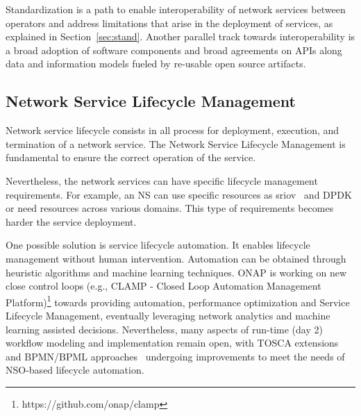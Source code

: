 Standardization is a path to enable interoperability of network services between operators and address limitations that arise in the deployment of services, as explained in Section~\ref{sec:stand}. Another parallel track towards interoperability is a broad adoption of software components and broad agreements on APIs along data and information models fueled by re-usable open source artifacts. 

\subsection{Network Service Lifecycle Management}

Network service lifecycle consists in all process for deployment, execution, and termination of a network service. The Network Service Lifecycle Management is fundamental to ensure the correct operation of the service.

Nevertheless, the network services can have specific lifecycle management requirements. For example, an NS can use specific resources as \gls{sriov}~\cite{5416637} and DPDK or need resources across various domains. This type of requirements becomes harder the service deployment.

One possible solution is service lifecycle automation. It enables lifecycle management without human intervention. Automation can be obtained through heuristic algorithms and machine learning techniques. ONAP is working on new close control loops (e.g., CLAMP - Closed Loop Automation Management Platform)\footnote{https://github.com/onap/clamp} towards providing automation, performance optimization and Service Lifecycle Management, eventually leveraging network analytics and machine learning assisted decisions.
Nevertheless, many aspects of run-time (day 2) workflow modeling and implementation remain open, with TOSCA extensions and BPMN/BPML approaches~\cite{DBLP:conf/closer/CalcaterraCMT17} undergoing improvements to meet the needs of NSO-based lifecycle automation.